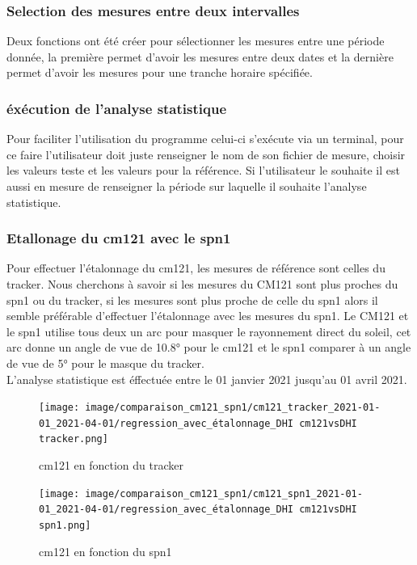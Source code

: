 \documentclass[12pt,a4paper]{article}
\begin{document}
\begin{flushleft}
\subsubsection{Selection des mesures entre deux intervalles}

Deux fonctions ont été créer pour sélectionner les mesures entre une période donnée, la première permet d'avoir les mesures entre deux dates et la dernière permet d'avoir les mesures pour une tranche horaire spécifiée.

\subsubsection{éxécution de l'analyse statistique}

Pour faciliter l'utilisation du programme celui-ci s'exécute via un terminal, pour ce faire l'utilisateur doit juste renseigner le nom de son fichier de mesure, choisir les valeurs teste et les valeurs pour la référence. Si l'utilisateur le souhaite il est aussi en mesure de renseigner la période sur laquelle il souhaite l'analyse statistique.

\subsubsection{Etallonage du cm121 avec le spn1}

Pour effectuer l'étalonnage du cm121, les mesures de référence sont celles du tracker. Nous cherchons à savoir si les mesures du CM121 sont plus proches du spn1 ou du tracker, si les mesures sont plus proche de celle du spn1 alors il semble préférable d'effectuer l'étalonnage avec les mesures du spn1. Le CM121 et le spn1 utilise tous deux un arc pour masquer le rayonnement direct du soleil, cet arc donne un angle de vue de 10.8° pour le cm121 et le spn1 comparer à un angle de vue de 5° pour le masque du tracker.\\
L'analyse statistique est éffectuée entre le 01 janvier 2021 jusqu'au 01 avril 2021.

\begin{figure}[H]
\centering
\texttt{[image: image/comparaison\_cm121\_spn1/cm121\_tracker\_2021-01-01\_2021-04-01/regression\_avec\_étalonnage\_DHI cm121vsDHI tracker.png]} 
\caption{cm121 en fonction du tracker}  
\end{figure}

\begin{figure}[H]
\centering
\texttt{[image: image/comparaison\_cm121\_spn1/cm121\_spn1\_2021-01-01\_2021-04-01/regression\_avec\_étalonnage\_DHI cm121vsDHI spn1.png]}  
\caption{cm121 en fonction du spn1}  
\end{figure}


\end{flushleft}
\end{document}
